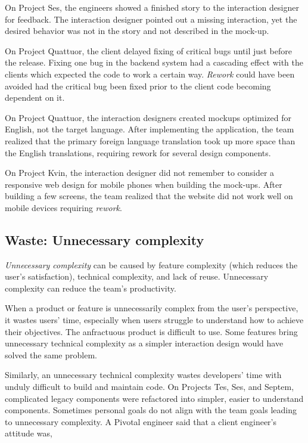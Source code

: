 On Project Ses, the engineers showed a finished story to the interaction designer for feedback. The interaction designer pointed out a missing interaction, yet the desired behavior was not in the story and not described in the mock-up.


On Project Quattuor, the client delayed fixing of critical bugs until just before the release. Fixing one bug in the backend system had a cascading effect with the clients which expected the code to work a certain way. \textit{Rework} could have been avoided had the critical bug been fixed prior to the client code becoming dependent on it.


On Project Quattuor, the interaction designers created mockups optimized for English, not the target language. After implementing the application, the team realized that the primary foreign language translation took up more space than the English translations, requiring rework for several design components. 


On Project Kvin, the interaction designer did not remember to consider a responsive web design for mobile phones when building the mock-ups. After building a few screens, the team realized that the website did not work well on mobile devices requiring \textit{rework}.
\subsection{Waste: Unnecessary complexity}
\textit{Unnecessary complexity} can be caused by feature complexity (which reduces the user's satisfaction), technical complexity, and lack of reuse. Unnecessary complexity can reduce the team's productivity. 


When a product or feature is unnecessarily complex from the user's perspective, it wastes users' time, especially when users struggle to understand how to achieve their objectives. The anfractuous product is difficult to use. Some features bring unnecessary technical complexity as a simpler interaction design would have solved the same problem. %


Similarly, an unnecessary technical complexity wastes developers' time with unduly difficult to build and maintain code. On Projects Tes, Ses, and Septem, complicated legacy components were refactored into simpler, easier to understand components. Sometimes personal goals do not align with the team goals leading to unnecessary complexity. A Pivotal engineer said that a client engineer's attitude was, 


